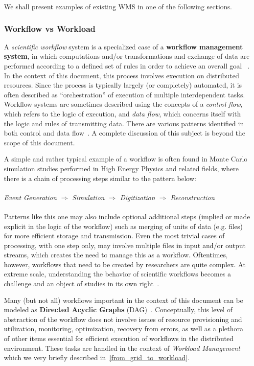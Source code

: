 We shall present examples of existing WMS in one of the following sections.

\subsubsection{Workflow vs Workload}
\label{workflow_workload}
A \textit{scientific workflow} system is a specialized case of a \textbf{workflow management system}, in which computations and/or transformations and exchange of data are performed according to a defined set of rules
in order to achieve an overall goal ~\cite{grid_workflow_taxonomy,grid_workflow_fit,pegasus}. In the context of this document, this process involves execution on distributed resources. Since the process is
typically largely (or completely) automated, it is often described as ``orchestration'' of execution of multiple interdependent tasks. Workflow systems are sometimes described using the concepts of a \textit{control flow},
which refers to the logic of execution, and \textit{data flow}, which concerns itself with the logic and rules of transmitting data. There are various patterns identified in both control and data flow~\cite{workflow_patterns}.
A complete discussion of this subject is beyond the scope of this document.

A simple and rather typical example of a workflow is often found in Monte Carlo simulation studies performed in High Energy Physics and related fields, where there is a chain of processing steps similar to the pattern below:
\\
\\
\textit{Event  Generation $\Longrightarrow$ Simulation $\Longrightarrow$ Digitization $\Longrightarrow$ Reconstruction}
\\
\\
Patterns like this one may also include optional additional steps (implied or made explicit in the logic of the workflow) such as merging of units of data (e.g. files) for more efficient storage and transmission.
Even the most trivial cases of processing, with one step only, may involve multiple files in input and/or output streams, which creates the need to manage this as a workflow. Oftentimes, however,
workflows that need to be created by researchers are quite complex. At extreme scale, understanding the behavior of scientific workflows becomes a challenge and an object of studies in its own right~\cite{panorama}.

Many (but not all) workflows important in the context of this document can be modeled as
\textbf{Directed Acyclic Graphs} (DAG)~\cite{pegasus,deft1,grid_workflow_taxonomy}.
Conceptually, this level of abstraction of the workflow does not  involve issues of resource provisioning and utilization, monitoring, optimization, recovery from errors, as well as a plethora of other items essential
for efficient execution of workflows in the distributed environment. These tasks are handled in the context of \textit{Workload Management} which we very briefly described in~\ref{from_grid_to_workload}.

